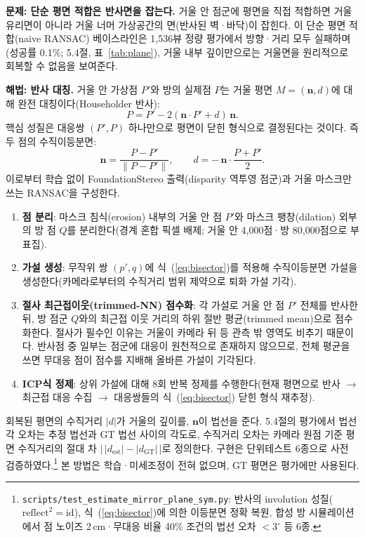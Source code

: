 \documentclass[twocolumn,10pt,a4paper]{article}
\begin{document}
\textbf{문제: 단순 평면 적합은 반사면을 잡는다.} 거울 안 점군에 평면을 직접 적합하면 거울 유리면이 아니라 거울 너머 가상공간의 면(반사된 벽·바닥)이 잡힌다. 이 단순 평면 적합(naive RANSAC) 베이스라인은 1,536뷰 정량 평가에서 방향·거리 모두 실패하며(성공률 0.1\%; 5.4절, 표~\ref{tab:plane}), 거울 내부 깊이만으로는 거울면을 원리적으로 회복할 수 없음을 보여준다.

\textbf{해법: 반사 대칭.} 거울 안 가상점 $P'$와 방의 실제점 $P$는 거울 평면 $M=(\mathbf{n}, d)$에 대해 완전 대칭이다(Householder 반사):
\begin{equation}
P = P' - 2(\mathbf{n}\cdot P' + d)\,\mathbf{n}.
\label{eq:reflect}
\end{equation}
핵심 성질은 대응쌍 $(P', P)$ 하나만으로 평면이 닫힌 형식으로 결정된다는 것이다. 즉 두 점의 수직이등분면:
\begin{equation}
\mathbf{n} = \frac{P - P'}{\lVert P - P' \rVert}, \qquad d = -\,\mathbf{n}\cdot\frac{P + P'}{2}.
\label{eq:bisector}
\end{equation}
이로부터 학습 없이 FoundationStereo 출력(disparity 역투영 점군)과 거울 마스크만 쓰는 RANSAC을 구성한다.
\begin{enumerate}\itemsep2pt
\item \textbf{점 분리}: 마스크 침식(erosion) 내부의 거울 안 점 $P'$와 마스크 팽창(dilation) 외부의 방 점 $Q$를 분리한다(경계 혼합 픽셀 배제; 거울 안 4,000점·방 80,000점으로 부표집).
\item \textbf{가설 생성}: 무작위 쌍 $(p', q)$에 식~(\ref{eq:bisector})를 적용해 수직이등분면 가설을 생성한다(카메라로부터의 수직거리 범위 제약으로 퇴화 가설 기각).
\item \textbf{절사 최근접이웃(trimmed-NN) 점수화}: 각 가설로 거울 안 점 $P'$ 전체를 반사한 뒤, 방 점군 $Q$와의 최근접 이웃 거리의 하위 절반 평균(trimmed mean)으로 점수화한다. 절사가 필수인 이유는 거울이 카메라 뒤 등 관측 밖 영역도 비추기 때문이다. 반사점 중 일부는 점군에 대응이 원천적으로 존재하지 않으므로, 전체 평균을 쓰면 무대응 점이 점수를 지배해 올바른 가설이 기각된다.
\item \textbf{ICP식 정제}: 상위 가설에 대해 8회 반복 정제를 수행한다(현재 평면으로 반사 $\to$ 최근접 대응 수집 $\to$ 대응쌍들의 식~(\ref{eq:bisector}) 닫힌 형식 재추정).
\end{enumerate}
회복된 평면의 수직거리 $|d|$가 거울의 깊이를, $\mathbf{n}$이 법선을 준다. 5.4절의 평가에서 법선각 오차는 추정 법선과 GT 법선 사이의 각도로, 수직거리 오차는 카메라 원점 기준 평면 수직거리의 절대 차 $\bigl|\,|d_{\mathrm{est}}|-|d_{\mathrm{GT}}|\,\bigr|$로 정의한다. 구현은 단위테스트 6종으로 사전 검증하였다.\footnote{\texttt{scripts/test\_estimate\_mirror\_plane\_sym.py}: 반사의 involution 성질($\mathrm{reflect}^2{=}\mathrm{id}$), 식~(\ref{eq:bisector})에 의한 이등분면 정확 복원, 합성 방 시뮬레이션에서 점 노이즈 2\,cm·무대응 비율 40\% 조건의 법선 오차 $<3^{\circ}$ 등 6종.} 본 방법은 학습·미세조정이 전혀 없으며, GT 평면은 평가에만 사용된다.
\end{document}
